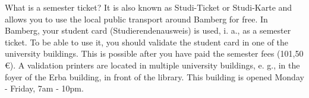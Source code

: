 What is a semester ticket?
It is also known as Studi-Ticket or Studi-Karte and allows you to use the local public transport around Bamberg for free.
In Bamberg, your student card (Studierendenausweis) is used, i. a., as a semester ticket.
To be able to use it, you should validate the student card in one of the university buildings.
This is possible after you have paid the semester fees (101,50 €).
A validation printers are located in multiple university buildings, e. g., in the foyer of the Erba building, in front of the library.
This building is opened Monday - Friday, 7am - 10pm. 
